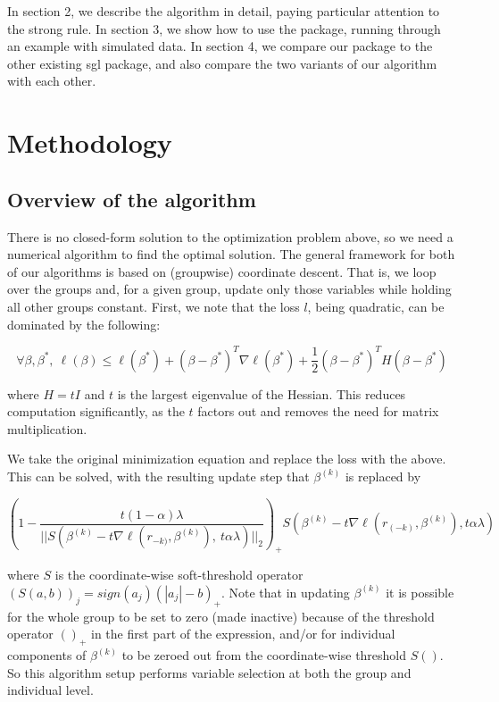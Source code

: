 \documentclass[titlepage]{article}
\begin{document}
In section 2, we describe the algorithm in detail, paying particular attention to the strong rule. In section 3, we show how to use the package, running through an example with simulated data. In section 4, we compare our package to the other existing sgl package, and also compare the two variants of our algorithm with each other.

\section{Methodology}

\subsection{Overview of the algorithm}

There is no closed-form solution to the optimization problem above, so we need a numerical algorithm to find the optimal solution. The general framework for both of our algorithms is based on (groupwise) coordinate descent. That is, we loop over the groups and, for a given group, update only those variables while holding all other groups constant. First, we note that the loss $l$, being quadratic, can be dominated by the following:

\[
\forall \beta,\beta^*,\ \ell(\beta) \leq \ell(\beta^*)+(\beta - \beta^*)^T\nabla \ell(\beta^*)+\frac{1}{2}(\beta - \beta^*)^T H (\beta - \beta^*)
\]

where $H = tI$ and $t$ is the largest eigenvalue of the Hessian. This reduces computation significantly, as the $t$ factors out and removes the need for matrix multiplication.

We take the original minimization equation and replace the loss with the above. This can be solved, with the resulting update step that $\beta^{(k)}$ is replaced by

\[
\left(1-\frac{t(1-\alpha)\lambda}{||S(\beta^{(k)}-t\nabla \ell(r_{-k)},\beta^{(k)}),\ t\alpha\lambda)||_2}\right)_+ S(\beta^{(k)}-t\nabla \ell(r_{(-k)},\beta^{(k)}),t\alpha\lambda)
\]

where  $S$ is the coordinate-wise soft-threshold operator $(S(a,b))_j = sign(a_j)(|a_j|-b)_+$. Note that in updating $\beta^{(k)}$ it is possible for the whole group to be set to zero (made inactive) because of the threshold operator $()_+$ in the first part of the expression, and/or for individual components of $\beta^{(k)}$ to be zeroed out from the coordinate-wise threshold $S()$. So this algorithm setup performs variable selection at both the group and individual level.
\end{document}

